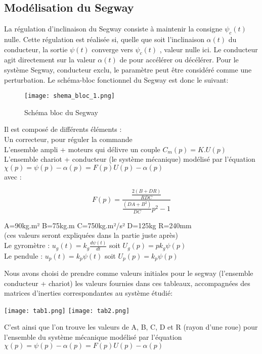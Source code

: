 \documentclass[oneside,a4paper,12pt]{article}
\begin{document}
	\subsection{Modélisation du Segway}
	
	La régulation d’inclinaison du Segway consiste à maintenir la consigne $ \psi_{c}(t) $ nulle. Cette régulation est réalisée si, quelle que soit l’inclinaison $ \alpha(t) $ du conducteur, la sortie $ \psi(t) $ converge vers $ \psi_{c}(t) $ , valeur nulle ici. Le conducteur agit directement sur la valeur $ \alpha(t) $ de pour accélérer ou décélérer. Pour le système Segway, conducteur exclu, le paramètre peut être considéré comme une perturbation. Le schéma-bloc fonctionnel du Segway est donc le suivant:
	
	\begin{figure}[h]
		\centering
		\texttt{[image: shema\_bloc\_1.png]}
		\caption{Schéma bloc du Segway}
	\end{figure}
	
	Il est composé de différents éléments :\\
	Un correcteur, pour réguler la commande\\
	L’ensemble ampli + moteurs qui délivre un couple $ C_{m}(p) = K.U(p) $\\
	L’ensemble chariot + conducteur (le système mécanique) modélisé par l’équation $ \chi(p) = \psi(p) - \alpha(p) = F(p)U(p) - \alpha(p) $\\
	avec :
	
	$$ F(p) = \frac{\frac{2(B+DR)}{RDC}}{\frac{(DA+B^{2})}{DC}p^{2}-1} $$

	A=90kg.m²
	B=75kg.m
	C=750kg.m²/s²
	D=125kg 
	R=240mm\\
	
	(ces valeurs seront expliquées dans la partie juste après)\\
	Le gyromètre : $ u_{g}(t) = k_{g}\frac{d\psi(t)}{dt} $ soit $ U_{g}(p) = pk_{g}\psi(p) $ \\
	Le pendule : $ u_{p}(t) = k_{p}\psi(t) $ soit $ U_{p}(p)=k_{p}\psi(p) $
	
	Nous avons choisi de prendre comme valeurs initiales pour le segway (l’ensemble conducteur + chariot) les valeurs fournies dans ces tableaux, accompagnées des matrices d’inerties correspondantes au système étudié:
	

	\begingroup
	\centering
	\texttt{[image: tab1.png]}
	\texttt{[image: tab2.png]}
	\endgroup
	
	C’est ainsi que l’on trouve les valeurs de A, B, C, D et R (rayon d’une roue) pour l’ensemble du système mécanique modélisé par l’équation $ \chi(p) = \psi(p) - \alpha(p) = F(p)U(p) - \alpha(p) $
	
\end{document}
